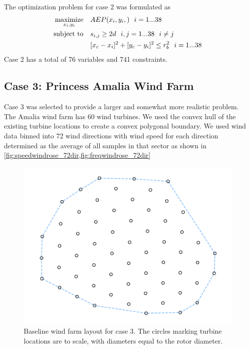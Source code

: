 \documentclass[a4paper]{jpconf}
\begin{document}
The optimization problem for case 2 was formulated as
%
\begin{equation}
	\label{e:objective}
	\begin{aligned} [b]
	\underset{x_i,y_i}{\textrm{maximize}} \quad & AEP(x_i,y_i,)~~i=1...38\\
	\textrm{subject to} \quad & s_{i,j} \geq 2\*d~~i,j=1...38~~i \neq j\\
	 & [x_c-x_i]^2+[y_c-y_i]^2 \leq r_{b}^2~~i=1...38
	\end{aligned}
\end{equation}
%
Case 2 has a total of 76 variables and 741 constraints.

\subsection{Case 3: Princess Amalia Wind Farm}
Case 3 was selected to provide a larger and somewhat more realistic problem. The Amalia wind farm has 60 wind turbines. We used the convex hull of the existing turbine locations to create a convex polygonal boundary. We used wind data binned into 72 wind directions with wind speed for each direction determined as the average of all samples in that sector as shown in \cref{fig:speedwindrose_72dir,fig:freqwindrose_72dir}
\begin{figure}[h!]
	\centering
	\begin{minipage}[t]{18pc}
		\centering
		\includegraphics[width=1.\textwidth, trim={1.0cm, 0cm, 1.0cm, 0cm}, clip]{final_images/layouts/60_turb_start.pdf}
		\caption{Baseline wind farm layout for case 3. The circles marking turbine locations are to scale, with diameters equal to the rotor diameter.}
		\label{fig:amalia_base_layout}
	\end{minipage}\hspace{1pc}%
\end{figure}
\end{document}
